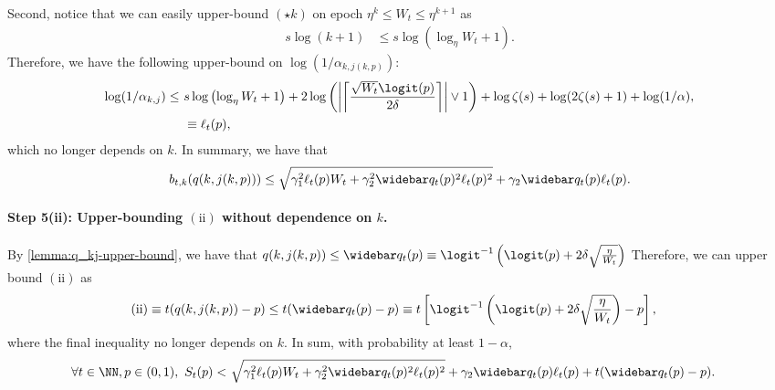     Second, notice that we can easily upper-bound $(\star k)$ on epoch $\eta^k \leq W_t \leq \eta^{k+1}$ as
    \begin{align*}
      s\log(k+1) &\leq s\log \left ( \log_\eta W_t + 1\right ) .
    \end{align*}
    Therefore, we have the following upper-bound on $\log(1/\alpha_{k,j(k,p)})$:
    \begin{align*}
      \log(1/\alpha_{k,j}) \leq \ &s\log \left ( \log_\eta W_t + 1\right ) +
                                2\log \left ( \left |  \left \lceil \frac{\sqrt{W_t} \logit(p)}{2\delta} \right \rceil \right |  \lor 1\right )+
                                  \log\zeta(s) + \log(2\zeta(s) + 1) + \log(1/\alpha),\\
                                  & \equiv \ell_t(p),
    \end{align*}
    which no longer depends on $k$. In summary, we have that
    \begin{equation*}
      b_{t,k} (q(k,j(k,p))) \leq \sqrt{\gamma_1^2 \ell_t(p) W_t + \gamma_2^2 \widebar q_t(p)^2 \ell_t(p)^2} + \gamma_2 \widebar q_t(p) \ell_t(p).
    \end{equation*}



    \paragraph{Step 5(ii): Upper-bounding $\mathrm{(ii)}$ without dependence on $k$.}
    By \cref{lemma:q_kj-upper-bound}, we have that $q({k,j(k,p)}) \leq \widebar q_t(p) \equiv \logit^{-1} \left ( \logit(p) + 2\delta \sqrt{\frac{\eta}{W_t}} \right )$
    Therefore, we can upper bound $\mathrm{(ii)}$ as 
    \begin{align}
      \mathrm{(ii)} \equiv  t(q({k, j(k,p)})-p) &\leq t(\widebar q_t(p) - p) \equiv t \left [ \logit^{-1} \left ( \logit(p) + 2\delta \sqrt{\frac{\eta}{W_t}} \right ) - p \right ],
    \end{align}
    where the final inequality no longer depends on $k$.
    In sum, with probability at least $1-\alpha$, 
    \begin{align}
      \forall t \in \NN, p \in (0, 1),\ S_t(p) <\ &\sqrt{\gamma_1^2 \ell_t(p) W_t + \gamma_2^2 \widebar q_t(p)^2 \ell_t(p)^2} 
       + \gamma_2 \widebar q_t(p) \ell_t(p) + t(\widebar q_t(p) - p) .
    \end{align}

